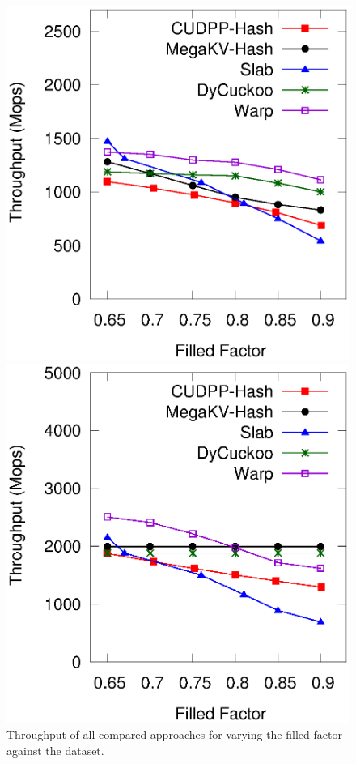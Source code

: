 \begin{figure}[h]
	\begin{minipage}{0.48\linewidth}\centering
		\includegraphics[width=\linewidth]{../pic/static-load_factor/twitter/insert.eps}
		\centerline{}
	\end{minipage}
	\hfill
	\begin{minipage}{0.48\linewidth}\centering
		\includegraphics[width=\linewidth]{../pic/static-load_factor/twitter/search.eps}
		\centerline{}
	\end{minipage}
	\caption{Throughput of all compared approaches for varying the filled factor against the \dstwitter dataset.}
	\label{fig:static-filled-factor}
\end{figure}

